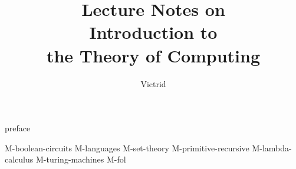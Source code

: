 \documentclass{CompTheo}
\title{Lecture Notes on\\ Introduction to \\ the Theory of Computing}
\author{Victrid}
\date{}
\begin{document}
\maketitle

\frontmatter
{preface}
\tableofcontents
\mainmatter

{M-boolean-circuits}
{M-languages}
{M-set-theory}
{M-primitive-recursive}
{M-lambda-calculus}
{M-turing-machines}
{M-fol}

\backmatter

\listoftheorems[ignoreall,show={theorem,lemma,corollary}]
\listoftheorems[ignoreall,show={definition}]
\end{document}
